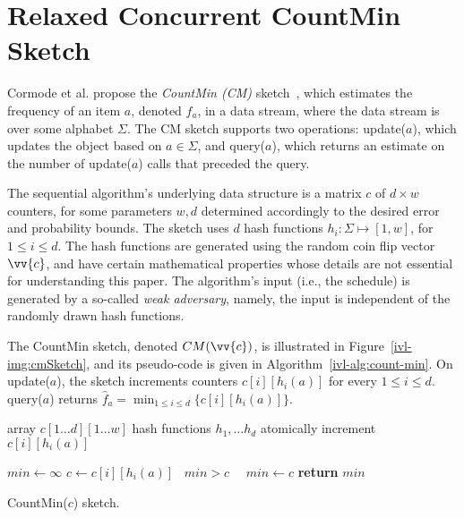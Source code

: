 \section{Relaxed Concurrent CountMin Sketch}
\label{ivl-sec:countMin}

Cormode et al. propose the \emph{CountMin (CM)} sketch~\cite{CountMin}, which
estimates the frequency of an item $a$, denoted $f_a$, in a data stream, where the data stream
is over some alphabet $\Sigma$. The CM sketch supports two operations: {\sc update}($a$),
which updates the object based on $a \in \Sigma$, and {\sc query}($a$), which returns
an estimate on the number of {\sc update}($a$) calls that preceded the query.

The sequential algorithm's underlying data structure is a matrix $c$ of $d \times w$ counters, for some parameters
$w,d$ determined accordingly to the desired error and probability bounds.
The sketch uses $d$ hash functions $h_i: \Sigma \mapsto [1,w]$, for $1 \leq i \leq d$.
The hash functions are generated using the random coin flip vector $\vv{c}$,
and have certain mathematical properties whose details are not essential for understanding this paper.
The algorithm's input (i.e., the schedule) is generated by a so-called \emph{weak adversary}, namely,
the input is independent of the randomly drawn hash functions.

The CountMin sketch, denoted $CM(\vv{c})$, is illustrated in Figure~\ref{ivl-img:cmSketch}, and its
pseudo-code is given in Algorithm~\ref{ivl-alg:count-min}.
On {\sc update}($a$), the sketch increments counters $c[i][h_i(a)]$ for every
$1 \leq i \leq d$. {\sc query}($a$) returns $\hat{f}_a=\min_{1 \leq i \leq d}\{c[i][h_i(a)]\}$.

\begin{algorithm}
    \begin{algorithmic}[1]

        \State array $c[1 \dots d][1 \dots w]$ 
        \State hash functions $h_1, \dots h_d$ 
        \Statex
        \State atomically increment $c[i][h_i(a)]$ \label{ivl-l:counter-inc}
        \EndFor
        \EndProcedure


        \State $min \gets \infty$
        \State $c \gets c[i][h_i(a)]$ \label{ivl-l:read-min}
        \State \algorithmicif\ $min > c$ \ \algorithmicthen\ $min \gets c$ \label{ivl-l:min-update}
        \EndFor
        \State \textbf{return} $min$
        \EndProcedure
    \end{algorithmic}
    \caption{CountMin($c$) sketch.}
    \label{ivl-alg:count-min}
\end{algorithm}

